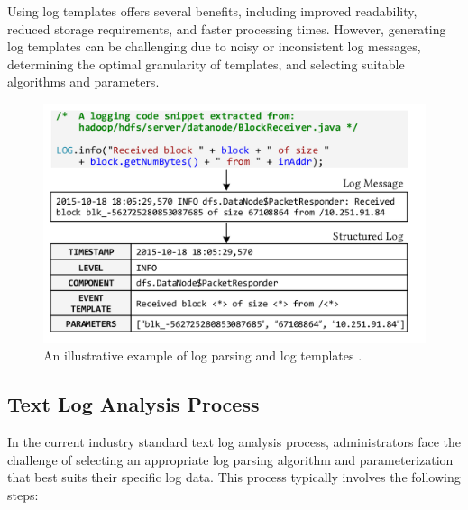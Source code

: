 Using log templates offers several benefits, including improved readability, reduced storage requirements, and faster processing times. However, generating log templates can be challenging due to noisy or inconsistent log messages, determining the optimal granularity of templates, and selecting suitable algorithms and parameters.


\begin{figure}[H]
    \centering
    \includegraphics[keepaspectratio=true,scale=0.5]{figures/4_methods/1_log_template_generation.png}
    \caption{An illustrative example of log parsing and log templates \cite{zhu2019tools}.}
    \label{fig:logTemplateGeneration}
\end{figure}
 

\subsection{Text Log Analysis Process}
\label{sec:Methods:Fundamentals:Analysis}
In the current industry standard text log analysis process, administrators face the challenge of selecting an appropriate log parsing algorithm and parameterization that best suits their specific log data. This process typically involves the following steps:

